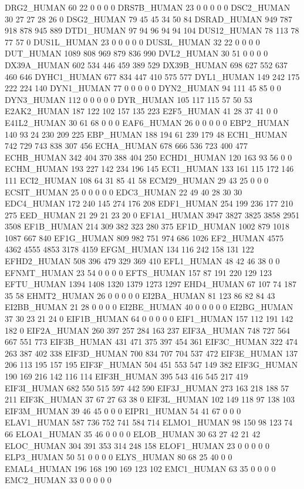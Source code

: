 DRG2_HUMAN	60	22	0	0	0	0
DRS7B_HUMAN	23	0	0	0	0	0
DSC2_HUMAN	30	27	27	28	26	0
DSG2_HUMAN	79	45	45	34	50	84
DSRAD_HUMAN	949	787	918	878	945	889
DTD1_HUMAN	97	94	96	94	94	104
DUS12_HUMAN	78	113	78	77	57	0
DUS1L_HUMAN	23	0	0	0	0	0
DUS3L_HUMAN	32	22	0	0	0	0
DUT_HUMAN	1089	808	969	879	836	990
DVL2_HUMAN	30	51	0	0	0	0
DX39A_HUMAN	602	534	446	459	389	529
DX39B_HUMAN	698	627	552	637	460	646
DYHC1_HUMAN	677	834	447	410	575	577
DYL1_HUMAN	149	242	175	222	224	140
DYN1_HUMAN	77	0	0	0	0	0
DYN2_HUMAN	94	111	45	85	0	0
DYN3_HUMAN	112	0	0	0	0	0
DYR_HUMAN	105	117	115	57	50	53
E2AK2_HUMAN	187	122	102	157	135	223
E2F5_HUMAN	41	28	37	41	0	0
E41L2_HUMAN	30	61	68	0	0	0
EAF6_HUMAN	26	0	0	0	0	0
EBP2_HUMAN	140	93	24	230	209	225
EBP_HUMAN	188	194	61	239	179	48
ECH1_HUMAN	742	729	743	838	307	456
ECHA_HUMAN	678	666	536	723	400	477
ECHB_HUMAN	342	404	370	388	404	250
ECHD1_HUMAN	120	163	93	56	0	0
ECHM_HUMAN	193	227	142	234	196	145
ECI1_HUMAN	133	161	115	172	146	111
ECI2_HUMAN	108	64	31	85	41	58
ECM29_HUMAN	29	43	25	0	0	0
ECSIT_HUMAN	25	0	0	0	0	0
EDC3_HUMAN	22	49	40	28	30	30
EDC4_HUMAN	172	240	145	274	176	208
EDF1_HUMAN	254	199	236	177	210	275
EED_HUMAN	21	29	21	23	20	0
EF1A1_HUMAN	3947	3827	3825	3858	2951	3508
EF1B_HUMAN	214	309	382	323	280	375
EF1D_HUMAN	1002	879	1018	1087	667	840
EF1G_HUMAN	809	982	751	974	686	1026
EF2_HUMAN	4575	4362	4555	4853	3178	4159
EFGM_HUMAN	134	116	242	158	131	122
EFHD2_HUMAN	508	396	479	329	369	410
EFL1_HUMAN	48	42	46	38	0	0
EFNMT_HUMAN	23	54	0	0	0	0
EFTS_HUMAN	157	87	191	220	129	123
EFTU_HUMAN	1394	1408	1320	1379	1273	1297
EHD4_HUMAN	67	107	74	187	35	58
EHMT2_HUMAN	26	0	0	0	0	0
EI2BA_HUMAN	81	123	86	82	84	43
EI2BB_HUMAN	21	28	0	0	0	0
EI2BE_HUMAN	40	0	0	0	0	0
EI2BG_HUMAN	37	30	23	21	24	0
EIF1B_HUMAN	64	0	0	0	0	0
EIF1_HUMAN	157	112	191	142	182	0
EIF2A_HUMAN	260	397	257	284	163	237
EIF3A_HUMAN	748	727	564	667	551	773
EIF3B_HUMAN	431	471	375	397	454	361
EIF3C_HUMAN	322	474	263	387	402	338
EIF3D_HUMAN	700	834	707	704	537	472
EIF3E_HUMAN	137	206	113	195	157	195
EIF3F_HUMAN	504	451	553	547	149	382
EIF3G_HUMAN	190	169	216	142	116	114
EIF3H_HUMAN	395	543	416	545	217	419
EIF3I_HUMAN	682	550	515	597	442	590
EIF3J_HUMAN	273	163	218	188	57	211
EIF3K_HUMAN	37	67	27	63	38	0
EIF3L_HUMAN	102	149	118	97	138	103
EIF3M_HUMAN	39	46	45	0	0	0
EIPR1_HUMAN	54	41	67	0	0	0
ELAV1_HUMAN	587	736	752	741	584	714
ELMO1_HUMAN	98	150	98	123	74	66
ELOA1_HUMAN	35	46	0	0	0	0
ELOB_HUMAN	30	63	27	42	21	42
ELOC_HUMAN	304	391	353	314	248	158
ELOF1_HUMAN	23	0	0	0	0	0
ELP3_HUMAN	50	51	0	0	0	0
ELYS_HUMAN	80	68	25	40	0	0
EMAL4_HUMAN	196	168	190	169	123	102
EMC1_HUMAN	63	35	0	0	0	0
EMC2_HUMAN	33	0	0	0	0	0
